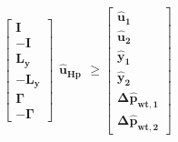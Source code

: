 \begin{equation}
	\begin{bmatrix}
		\bm{I} 	\\
		-\bm{I} 	\\
		\bm{L_{y}}	\\
		-\bm{L_{y}}	\\
		\bm{\Gamma}	\\
		-\bm{\Gamma}
	\end{bmatrix}
	\begin{matrix}
			\bm{\hat{u}_{Hp}}
	\end{matrix}
	\geq 
	\begin{bmatrix}
			\bm{\hat{u}_{1}}	\\
			\bm{\hat{u}_{2}}	\\
			\bm{\hat{y}_{1}}	\\
			\bm{\hat{y}_{2}}	\\
			\bm{\Delta \hat{p}_{wt,1}}	\\
			\bm{\Delta \hat{p}_{wt,2}}	
	\end{bmatrix}
\end{equation}






